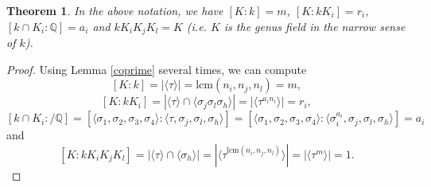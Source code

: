 \documentclass[12pt,a4paper]{article}
\newtheorem{theorem}{Theorem}
\theoremstyle{definition}
\newcommand{\Q}{\mathbb{Q}}
\newcommand{\lcm}{\mathrm{lcm}}
\begin{document}
\begin{theorem}
In the above notation, we have $[K:k]=m$, $[K:kK_i]=r_i$, $[k\cap K_i:\Q]=a_i$ and $kK_iK_jK_l=K$ (i.e. $K$ is the genus field in the narrow sense of $k$).
\end{theorem}
\begin{proof}
Using Lemma \ref{coprime} several times, we can compute
$$[K:k]=|\langle\tau\rangle|=\lcm\left(n_i,n_j,n_l\right)=m,$$
$$[K:kK_i]=|\langle\tau\rangle\cap \langle\sigma_j\sigma_l\sigma_h\rangle|=|\langle\tau^{a_in_i}\rangle|=r_i,$$
$$[k\cap K_i:/\Q]=[\langle\sigma_1,\sigma_2,\sigma_3,\sigma_4\rangle:\langle\tau,\sigma_j,\sigma_l,\sigma_h\rangle]=[\langle\sigma_1,\sigma_2,\sigma_3,\sigma_4\rangle:\langle\sigma_i^{a_i},\sigma_j,\sigma_l,\sigma_h\rangle]=a_i$$
and
$$[K:kK_iK_jK_l]=|\langle\tau\rangle\cap \langle\sigma_h\rangle|=|\langle\tau^{\lcm\left(n_i,n_j,n_l\right)}\rangle|=|\langle\tau^m\rangle|=1.$$
\end{proof}
\end{document}
